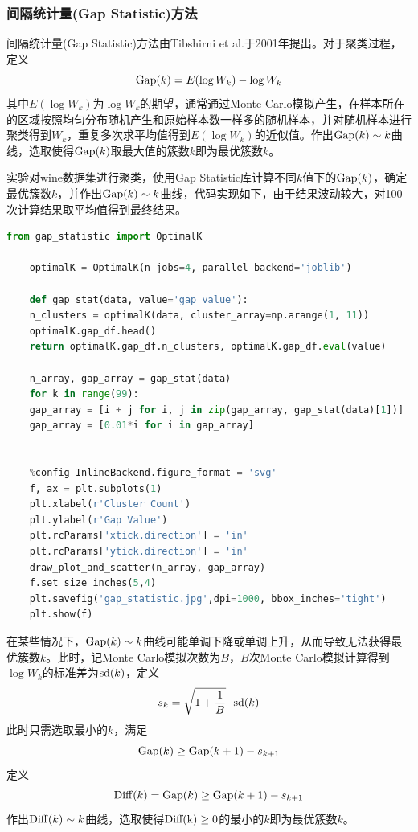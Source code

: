 \documentclass[12pt]{article}
\begin{document}
\subsubsection{间隔统计量(Gap Statistic)方法}
	间隔统计量(Gap Statistic)方法由Tibshirni et al.于2001年提出\citealp{tibshirani2001estimating}。对于聚类过程，定义
	$$
	{\rm Gap}(k)=E(\log W_{k})-\log W_{k}
	$$
	其中$E(\log W_{k})$为$\log W_{k}$的期望，通常通过Monte Carlo模拟产生，在样本所在的区域按照均匀分布随机产生和原始样本数一样多的随机样本，并对随机样本进行聚类得到$W_{k}$，重复多次求平均值得到$E(\log W_{k})$的近似值。作出${\rm Gap}(k)\sim k$曲线，选取使得${\rm Gap}(k)$取最大值的簇数$k$即为最优簇数$k$。\par 
	实验对wine数据集进行聚类，使用Gap Statistic库计算不同$k$值下的${\rm Gap}(k)$，确定最优簇数$k$，并作出${\rm Gap}(k)\sim k$曲线，代码实现如下，由于结果波动较大，对100次计算结果取平均值得到最终结果。\par 
\begin{lstlisting}[language=python]
	from gap_statistic import OptimalK
	
	optimalK = OptimalK(n_jobs=4, parallel_backend='joblib')
	
	def gap_stat(data, value='gap_value'):
	n_clusters = optimalK(data, cluster_array=np.arange(1, 11))
	optimalK.gap_df.head()
	return optimalK.gap_df.n_clusters, optimalK.gap_df.eval(value)
		
	n_array, gap_array = gap_stat(data)
	for k in range(99):
	gap_array = [i + j for i, j in zip(gap_array, gap_stat(data)[1])]
	gap_array = [0.01*i for i in gap_array]
		
		
	%config InlineBackend.figure_format = 'svg'
	f, ax = plt.subplots(1)
	plt.xlabel(r'Cluster Count')
	plt.ylabel(r'Gap Value')
	plt.rcParams['xtick.direction'] = 'in'
	plt.rcParams['ytick.direction'] = 'in'
	draw_plot_and_scatter(n_array, gap_array)
	f.set_size_inches(5,4)
	plt.savefig('gap_statistic.jpg',dpi=1000, bbox_inches='tight')
	plt.show(f)
\end{lstlisting}
\par 
	在某些情况下，${\rm Gap}(k)\sim k$曲线可能单调下降或单调上升，从而导致无法获得最优簇数$k$。此时，记Monte Carlo模拟次数为$B$，$B$次Monte Carlo模拟计算得到$\log W_{k}$的标准差为${\rm sd}(k)$，定义
	$$
	s_{k}=\sqrt{1+\frac{1}{B}} \ \ {\rm sd}(k)
	$$
	此时只需选取最小的$k$，满足
	$$
	{\rm Gap}(k)\geq {\rm Gap}(k+1)-s_{k+1}
	$$
	定义
	$$
	{\rm Diff}(k) = {\rm Gap}(k)\geq {\rm Gap}(k+1)-s_{k+1}
	$$
	作出${\rm Diff}(k)\sim k$曲线，选取使得${\rm Diff(k)}\geq 0$的最小的$k$即为最优簇数$k$。\par 
\end{document}
